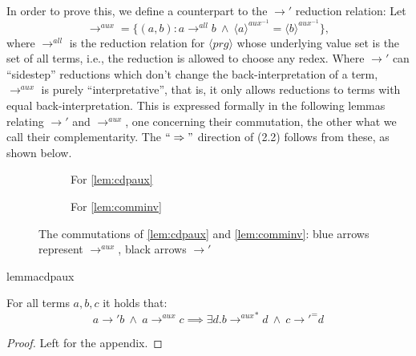 In order to prove this, we define a counterpart to the $\longrightarrow'$ reduction relation: Let
\[
\longrightarrow^{aux} = \{(a,b) : a \longrightarrow^{all} b ~ \land ~ \langle a \rangle^{aux^{-1}} = \langle b \rangle^{aux^{-1}}\},
\]
where $\longrightarrow^{all}$ is the reduction relation for $\langle prg \rangle$ whose underlying value set is the set of all terms, i.e., the reduction is allowed to choose any redex. Where $\longrightarrow'$ can ``sidestep'' reductions which don't change the back-interpretation of a term, $\longrightarrow^{aux}$ is purely ``interpretative'', that is, it only allows reductions to terms with equal back-interpretation. This is expressed formally in the following lemmas relating $\longrightarrow'$ and $\longrightarrow^{aux}$, one concerning their commutation, the other what we call their complementarity. The $`` \Rightarrow "$ direction of (2.2) follows from these, as shown below.

\begin{figure}
\begin{subfigure}{0.3\textwidth}
\caption{For \autoref{lem:cdpaux}}
\end{subfigure}
\begin{subfigure}{0.3\textwidth}
\caption{For \autoref{lem:comminv}}
\label{fig:comminv}
\end{subfigure}
\caption{The commutations of \autoref{lem:cdpaux} and \autoref{lem:comminv}: blue arrows represent $\longrightarrow^{aux}$, black arrows $\longrightarrow'$}
\end{figure}

\begin{restatable}[Commutation]{lemma}{cdpaux}
\label{lem:cdpaux}

For all terms $a,b,c$ it holds that:
\[
a {\longrightarrow'} b ~ \land ~ a \longrightarrow^{aux} c \implies \exists d . b {\longrightarrow^{aux}}^* d ~ \land ~ c {\longrightarrow'}^= d
\]

\end{restatable}
\begin{proof}
Left for the appendix.
\end{proof}

